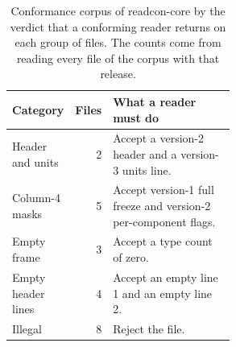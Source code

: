 \begin{table}[tbp]
\centering
\small
\caption{Conformance corpus of readcon-core \readconversion{} by the verdict that a conforming reader returns on each group of files.
The counts come from reading every file of the corpus with that release.}
\label{tab:corpus}
\begin{tabular}{@{}lrp{0.55\linewidth}@{}}
\toprule
Category & Files & What a reader must do \\
\midrule
Header and units & 2 & Accept a version-2 header and a version-3 units line. \\
Column-4 masks & 5 & Accept version-1 full freeze and version-2 per-component flags. \\
Empty frame & 3 & Accept a type count of zero. \\
Empty header lines & 4 & Accept an empty line 1 and an empty line 2. \\
Illegal & 8 & Reject the file. \\
\bottomrule
\end{tabular}
\end{table}
